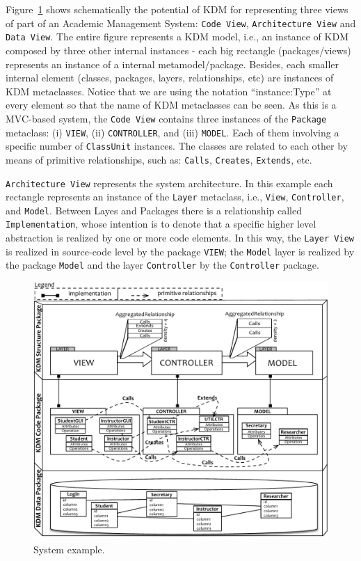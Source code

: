 Figure~\ref{fig:system} shows schematically the potential of KDM for representing three views of part of an Academic Management System: \texttt{Code View}, \texttt{Architecture View} and \texttt{Data View}. The entire figure represents a KDM model, i.e., an instance of KDM composed by three other internal instances - each big rectangle (packages/views) represents an instance of a internal metamodel/package. Besides, each smaller internal element (classes, packages, layers, relationships, etc) are instances of KDM metaclasses. Notice that we are using the notation ``instance:Type'' at every element so that the name of KDM metaclasses can be seen.
As this is a MVC-based system, the \texttt{Code View} contains three instances of the \texttt{Package} metaclass: (i) \texttt{VIEW}, (ii) \texttt{CONTROLLER}, and (iii) \texttt{MODEL}. Each of them involving a specific number of \texttt{ClassUnit} instances. The classes are related to each other by means of primitive relationships, such as: \texttt{Calls}, \texttt{Creates}, \texttt{Extends}, etc.

\texttt{Architecture View} represents the system architecture. In this example each rectangle represents an instance of the \texttt{Layer} metaclass, i.e., \texttt{View}, \texttt{Controller}, and \texttt{Model}. Between Layes and Packages there is a relationship called \texttt{Implementation}, whose intention is to denote that a specific higher level abstraction is realized by one or more code elements. In this way, the \texttt{Layer View} is realized in source-code level by the package \texttt{VIEW}; the \texttt{Model} layer is realized by the package \texttt{Model} and the layer \texttt{Controller} by the \texttt{Controller} package.

\begin{figure}
	\centering
	\includegraphics[scale=0.5]{figuras/NovoSystem2}
	\caption{System example.}
	\label{fig:system}
\end{figure}

